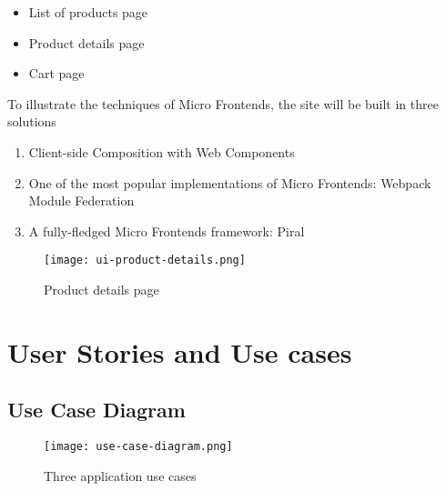 \documentclass[a4paper]{book}
\begin{document}
\begin{itemize}
    \item List of products page
    \item Product details page
    \item Cart page
\end{itemize}
To illustrate the techniques of Micro Frontends, the site will be built in three solutions

\begin{enumerate}
    \item Client-side Composition with Web Components
    \item One of the most popular implementations of Micro Frontends: Webpack Module Federation
    \item A fully-fledged Micro Frontends framework: Piral
\end{enumerate}



\clearpage
\begin{figure}[h!]
    \centering
    \captionsetup{justification=centering}
    \texttt{[image: ui-product-details.png]}
    \caption{Product details page}
    \label{fig:ui-product-details}
\end{figure}

\section{User Stories and Use cases} \label{User Stories and Use cases}

\subsection{Use Case Diagram}
\begin{figure}[ht]
  \centering
  \captionsetup{justification=centering}
  \texttt{[image: use-case-diagram.png]}
  \caption{Three application use cases}
  \label{fig:use-case-diagram}
\end{figure}
\end{document}
